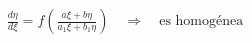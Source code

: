 \documentclass[preview]{standalone}
\begin{document}
\begin{align*}
\frac{d\eta}{d\xi}=f\left(\frac{a\xi+b\eta}{a_1\xi+b_1\eta}\right)\quad\Rightarrow\quad\text{es homogénea}
\end{align*}
\end{document}
